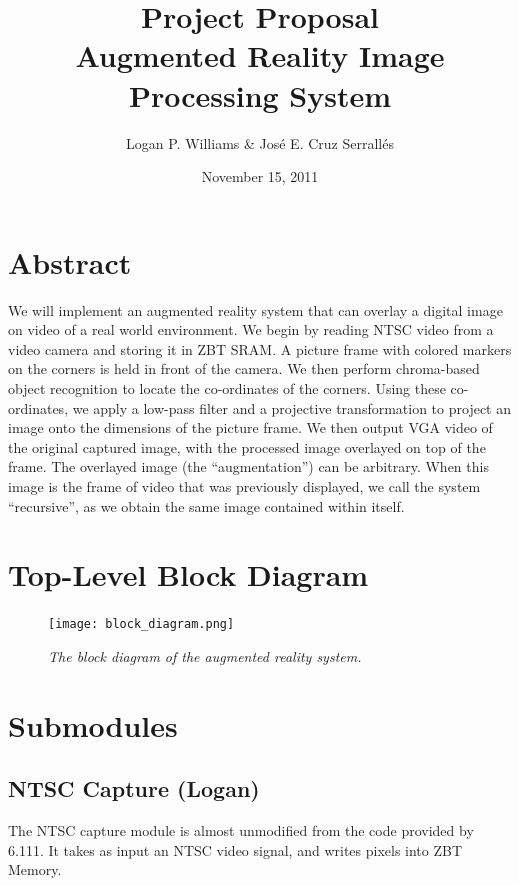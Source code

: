 \documentclass[10pt]{article}
\begin{document}
\title{Project Proposal\\Augmented Reality Image Processing System}
\author{Logan P. Williams \& Jos\'{e} E. Cruz Serrall\'{e}s}
\date{November 15, 2011}
\maketitle



\section*{Abstract}
We will implement an augmented reality system that can overlay a digital image on video of a real world environment. We begin by reading NTSC video from a video camera and storing it in ZBT SRAM. A picture frame with colored markers on the corners is held in front of the camera. We then perform chroma-based object recognition to locate the co-ordinates of the corners. Using these co-ordinates, we apply a low-pass filter and a projective transformation to project an image onto the dimensions of the picture frame. We then output VGA video of the original captured image, with the processed image overlayed on top of the frame. The overlayed image (the ``augmentation'') can be arbitrary. When this image is the frame of video that was previously displayed, we call the system ``recursive'', as we obtain the same image contained within itself.

\tableofcontents


\section{Top-Level Block Diagram}
\begin{figure}[h]
\centering
\texttt{[image: block\_diagram.png]}
\caption{\emph{The block diagram of the augmented reality system.}}
\end{figure}
\section{Submodules}
\subsection{NTSC Capture (Logan)}
The NTSC capture module is almost unmodified from the code provided by 6.111. It takes as input an NTSC video signal, and writes pixels into ZBT Memory.
\end{document}
